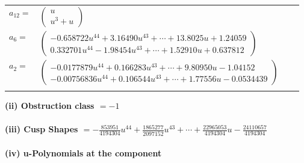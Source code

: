 \documentclass[1p]{elsarticle_modified}
\theoremstyle{definition}
\begin{document}
\begin{tabular}{m{7pt} m{180pt} m{7pt} m{180pt} }
\flushright $a_{12}=$&$\begin{pmatrix}u\\u^3+u\end{pmatrix}$ \\
\flushright $a_{6}=$&$\begin{pmatrix}-0.658722 u^{44}+3.16490 u^{43}+\cdots+13.8025 u+1.24059\\0.332701 u^{44}-1.98454 u^{43}+\cdots+1.52910 u+0.637812\end{pmatrix}$ \\
\flushright $a_{2}=$&$\begin{pmatrix}-0.0177879 u^{44}+0.166283 u^{43}+\cdots+9.80950 u-1.04152\\-0.00756836 u^{44}+0.106544 u^{43}+\cdots+1.77556 u-0.0534439\end{pmatrix}$\\&\end{tabular}
\flushleft \textbf{(ii) Obstruction class $= -1$}\\~\\
\flushleft \textbf{(iii) Cusp Shapes $= -\frac{853951}{4194304} u^{44}+\frac{1865277}{2097152} u^{43}+\cdots+\frac{22965053}{4194304} u-\frac{24110657}{4194304}$}\\~\\
\newpage\renewcommand{\arraystretch}{1}
\flushleft \textbf{(iv) u-Polynomials at the component}\newline \\
\end{document}
